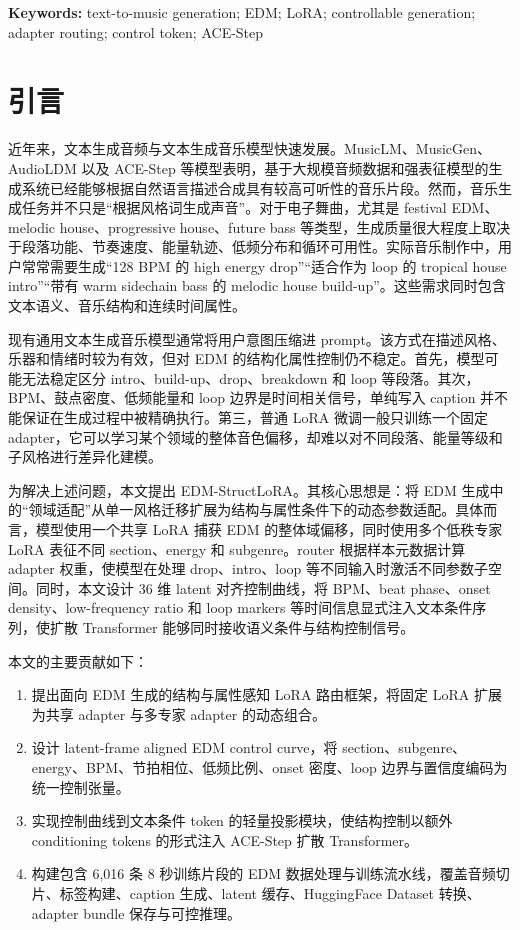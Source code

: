 \documentclass[UTF8,a4paper,zihao=-4,fontset=none]{ctexart}
\newcommand{\modelname}{EDM-StructLoRA}
\begin{document}
\noindent\textbf{Keywords:} text-to-music generation; EDM; LoRA; controllable generation; adapter routing; control token; ACE-Step

\section{引言}

近年来，文本生成音频与文本生成音乐模型快速发展。MusicLM、MusicGen、AudioLDM 以及 ACE-Step 等模型表明，基于大规模音频数据和强表征模型的生成系统已经能够根据自然语言描述合成具有较高可听性的音乐片段。然而，音乐生成任务并不只是“根据风格词生成声音”。对于电子舞曲，尤其是 festival EDM、melodic house、progressive house、future bass 等类型，生成质量很大程度上取决于段落功能、节奏速度、能量轨迹、低频分布和循环可用性。实际音乐制作中，用户常常需要生成“128 BPM 的 high energy drop”“适合作为 loop 的 tropical house intro”“带有 warm sidechain bass 的 melodic house build-up”。这些需求同时包含文本语义、音乐结构和连续时间属性。

现有通用文本生成音乐模型通常将用户意图压缩进 prompt。该方式在描述风格、乐器和情绪时较为有效，但对 EDM 的结构化属性控制仍不稳定。首先，模型可能无法稳定区分 intro、build-up、drop、breakdown 和 loop 等段落。其次，BPM、鼓点密度、低频能量和 loop 边界是时间相关信号，单纯写入 caption 并不能保证在生成过程中被精确执行。第三，普通 LoRA 微调一般只训练一个固定 adapter，它可以学习某个领域的整体音色偏移，却难以对不同段落、能量等级和子风格进行差异化建模。

为解决上述问题，本文提出 \modelname。其核心思想是：将 EDM 生成中的“领域适配”从单一风格迁移扩展为结构与属性条件下的动态参数适配。具体而言，模型使用一个共享 LoRA 捕获 EDM 的整体域偏移，同时使用多个低秩专家 LoRA 表征不同 section、energy 和 subgenre。router 根据样本元数据计算 adapter 权重，使模型在处理 drop、intro、loop 等不同输入时激活不同参数子空间。同时，本文设计 36 维 latent 对齐控制曲线，将 BPM、beat phase、onset density、low-frequency ratio 和 loop markers 等时间信息显式注入文本条件序列，使扩散 Transformer 能够同时接收语义条件与结构控制信号。

本文的主要贡献如下：

\begin{enumerate}[leftmargin=2em,itemsep=0.2em]
  \item 提出面向 EDM 生成的结构与属性感知 LoRA 路由框架，将固定 LoRA 扩展为共享 adapter 与多专家 adapter 的动态组合。
  \item 设计 latent-frame aligned EDM control curve，将 section、subgenre、energy、BPM、节拍相位、低频比例、onset 密度、loop 边界与置信度编码为统一控制张量。
  \item 实现控制曲线到文本条件 token 的轻量投影模块，使结构控制以额外 conditioning tokens 的形式注入 ACE-Step 扩散 Transformer。
  \item 构建包含 6,016 条 8 秒训练片段的 EDM 数据处理与训练流水线，覆盖音频切片、标签构建、caption 生成、latent 缓存、HuggingFace Dataset 转换、adapter bundle 保存与可控推理。
\end{enumerate}
\end{document}
